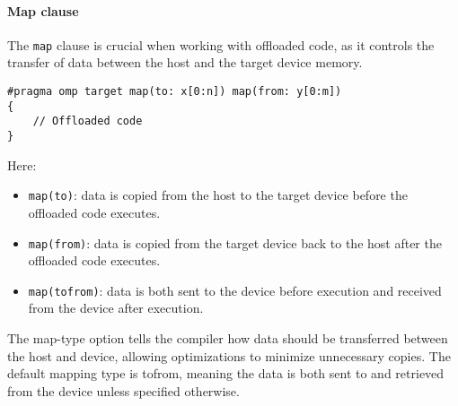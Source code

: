\paragraph*{Map clause}
The \texttt{map} clause is crucial when working with offloaded code, as it controls the transfer of data between the host and the target device memory.
\begin{lstlisting}[style=C]
#pragma omp target map(to: x[0:n]) map(from: y[0:m])
{
    // Offloaded code
}
\end{lstlisting}
Here: 
\begin{itemize}
    \item \texttt{map(to)}: data is copied from the host to the target device before the offloaded code executes.
    \item \texttt{map(from)}: data is copied from the target device back to the host after the offloaded code executes.
    \item \texttt{map(tofrom)}: data is both sent to the device before execution and received from the device after execution.
\end{itemize}
The map-type option tells the compiler how data should be transferred between the host and device, allowing optimizations to minimize unnecessary copies. 
The default mapping type is tofrom, meaning the data is both sent to and retrieved from the device unless specified otherwise.